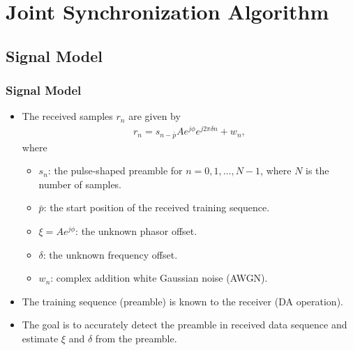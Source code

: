\section{Joint Synchronization Algorithm}

\subsection{Signal Model}

\begin{frame}
  \frametitle{Signal Model}
  \begin{itemize}
    \item The received samples $r_n$ are given by
    \begin{equation*}
      \begin{aligned}
        \label{eq:model}
        r_n = s_{n-\bar{p}}Ae^{j\phi}e^{j2\pi\delta n}+w_{n},
      \end{aligned}
    \end{equation*}
    where
    \begin{itemize}
        \item $s_n$: the pulse-shaped preamble for $n=0,1,\ldots,N{-}1$, where $N$ is the number of samples.
        \item $\bar{p}$: the start position of the received training sequence.
        \item $\xi=Ae^{j\phi}$: the unknown phasor offset.
        \item $\delta$: the unknown frequency offset.
        \item $w_n$: complex addition white Gaussian noise (AWGN).
    \end{itemize}
    \item The training sequence (preamble) is known to the receiver (DA operation). 
    \item The goal is to accurately detect the preamble in received data sequence and estimate $\xi$ and $\delta$ from the preamble.
\end{itemize}
  
\end{frame}

